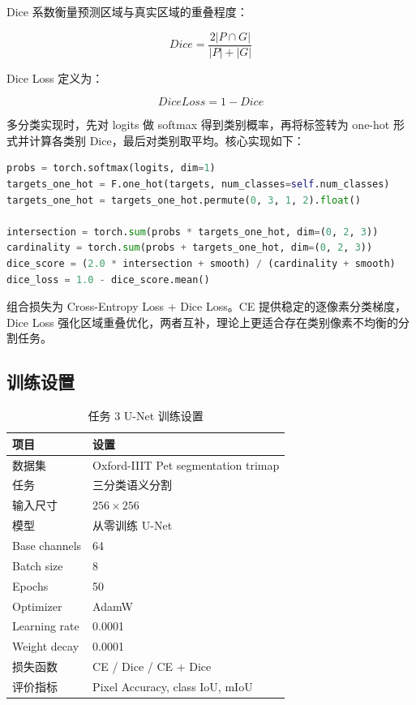 \documentclass[UTF8,a4paper,12pt]{ctexart}
\begin{document}
Dice 系数衡量预测区域与真实区域的重叠程度：

\[
Dice = \frac{2|P\cap G|}{|P|+|G|}
\]

Dice Loss 定义为：

\[
DiceLoss = 1 - Dice
\]

多分类实现时，先对 logits 做 softmax 得到类别概率，再将标签转为 one-hot 形式并计算各类别 Dice，最后对类别取平均。核心实现如下：

\begin{lstlisting}[language=Python]
probs = torch.softmax(logits, dim=1)
targets_one_hot = F.one_hot(targets, num_classes=self.num_classes)
targets_one_hot = targets_one_hot.permute(0, 3, 1, 2).float()

intersection = torch.sum(probs * targets_one_hot, dim=(0, 2, 3))
cardinality = torch.sum(probs + targets_one_hot, dim=(0, 2, 3))
dice_score = (2.0 * intersection + smooth) / (cardinality + smooth)
dice_loss = 1.0 - dice_score.mean()
\end{lstlisting}

组合损失为 Cross-Entropy Loss + Dice Loss。CE 提供稳定的逐像素分类梯度，Dice Loss 强化区域重叠优化，两者互补，理论上更适合存在类别像素不均衡的分割任务。

\subsection{训练设置}

\begin{table}[H]
\centering
\caption{任务 3 U-Net 训练设置}
\begin{tabular}{ll}
\toprule
项目 & 设置 \\
\midrule
数据集 & Oxford-IIIT Pet segmentation trimap \\
任务 & 三分类语义分割 \\
输入尺寸 & $256\times256$ \\
模型 & 从零训练 U-Net \\
Base channels & 64 \\
Batch size & 8 \\
Epochs & 50 \\
Optimizer & AdamW \\
Learning rate & 0.0001 \\
Weight decay & 0.0001 \\
损失函数 & CE / Dice / CE + Dice \\
评价指标 & Pixel Accuracy, class IoU, mIoU \\
\bottomrule
\end{tabular}
\end{table}
\end{document}

